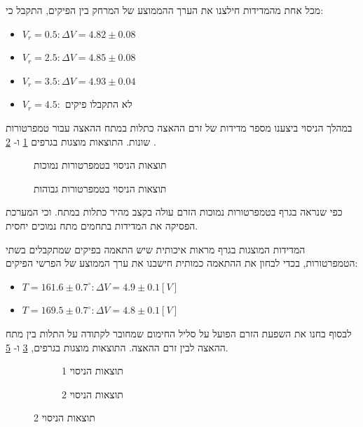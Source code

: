 \documentclass{article}
\begin{document}
מכל אחת מהמדידות חילצנו את הערך ההממוצע של המרחק בין הפיקים, התקבל כי:
\begin{itemize}
    \item $V_r=0.5: \Delta V =4.82 \pm 0.08$
    \item $V_r=2.5: \Delta V =4.85 \pm 0.08$
    \item $V_r=3.5: \Delta V =4.93 \pm 0.04$
    \item $V_r=4.5:$ לא התקבלו פיקים
\end{itemize}

במהלך הניסוי ביצענו מספר מדידות של זרם ההאצה כתלות במתח ההאצה עבור טמפרטורות שונות.
התוצאות מוצגות בגרפים
\ref{fig:Changing_temp_0-10v}
ו-
\ref{fig:Changing_temp_0-30v}
.

\begin{graph}[H]
    \begin{subfigure}[b]{\textwidth}
    	\centering
    	\resizebox{\textwidth}{!}{}
    	\caption{תוצאות הניסוי בטמפרטורות נמוכות}
    	\label{fig:Changing_temp_0-10v}
    \end{subfigure}
    \hfill
    \begin{subfigure}[b]{\textwidth}
    	\centering
    	\resizebox{\textwidth}{!}{}
    	\caption{תוצאות הניסוי בטמפרטורות גבוהות}
    	\label{fig:Changing_temp_0-30v}
    \end{subfigure}
    \label{fig:Changing_temp}
\end{graph}

כפי שנראה בגרף 
\label{fig:Changing_temp_0-10v}
בטמפרטורות נמוכות הזרם עולה בקצב מהיר כתלות במתח. 
וכי המערכת הפסיקה את המדידות בתחמים מתח נמוכים יחסית.

המדידות המוצגות בגרף
\label{fig:Changing_temp_0-30v}
מראות איכותית שיש התאמה בפיקים שמתקבלים בשתי הטמפרטורות, בכדי לבחון את ההתאמה כמותית חישבנו את ערך הממוצע של הפרשי הפיקים:
\begin{itemize}
    \item $T = 161.6 \pm 0.7 ^{\circ}:\Delta V = 4.9 \pm 0.1  [V]$ 
    \item $T = 169.5 \pm 0.7 ^{\circ}:\Delta V = 4.8 \pm 0.1  [V]$ 
\end{itemize}

לבסוף בחנו את השפעת הזרם הפועל על סליל החימום שמחובר לקתודה על התלות בין מתח ההאצה לבין זרם ההאצה.
התוצאות מוצגות בגרפים,
\ref{fig:Changing_Ih_25-28mA}
ו-
\ref{fig:Changing_Ih_23-28mA}.
\begin{figure}[H]
    \begin{subfigure}[b]{\textwidth}
    	\centering
    	\resizebox{\textwidth}{!}{}
    	\caption{תוצאות הניסוי 1}
    	\label{fig:Changing_Ih_25-28mA}
    \end{subfigure}
    \hfill
    \begin{subfigure}[b]{\textwidth}
    	\centering
    	\resizebox{\textwidth}{!}{}
    	\caption{תוצאות הניסוי 2}
    	\label{fig:Changing_Ih_23-28mA}
    \end{subfigure}
\end{figure}
\end{document}
